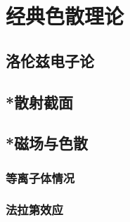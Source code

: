 

\section{经典色散理论}\label{27-4}

\subsection{洛伦兹电子论}\label{27-4-1}

\subsection{*散射截面}\label{27-4-2}

\subsection{*磁场与色散}\label{27-4-3}

\subsubsection{等离子体情况}\label{27-4-3-1}

\subsubsection{法拉第效应}\label{27-4-3-2}
